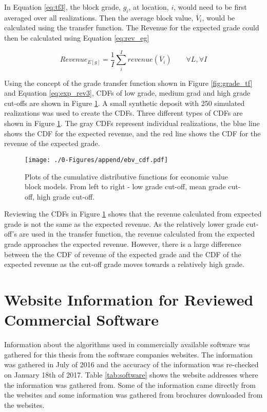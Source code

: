    In Equation \ref{eq:tf3}, the block grade, $g_i$, at location, $i$, would need to be first averaged over all realizations. Then the average block value, $\overline{V}_i$, would be calculated using the transfer function. The Revenue for the expected grade could then be calculated using Equation \ref{eq:rev_eg}

    \begin{equation}
        Revenue_{E\left [ g \right ]} = \frac{1}{I}\sum_{i}^{I}revenue\left ( \overline{V}_i \right ) \qquad \forall L, \forall I
        \label{eq:rev_eg}
    \end{equation}

    Using the concept of the grade transfer function shown in Figure \ref{fig:grade_tf} and Equation \ref{eq:exp_rev3}, \glspl{CDF} of low grade, medium grad and high grade cut-offs are shown in Figure \ref{fig:ebv_cdf}. A small synthetic deposit with 250 simulated realizations was used to create the \glspl{CDF}. Three different types of \glspl{CDF} are shown in Figure \ref{fig:ebv_cdf}. The gray \glspl{CDF} represent individual realizations, the blue line shows the \gls{CDF} for the expected revenue, and the red line shows the \gls{CDF} for the revenue of the expected grade.

    \begin{figure}[htb] %
        \centering
        \texttt{[image: ./0-Figures/append/ebv\_cdf.pdf]}
        \caption[CDF's of expected block value models from different grade transfer functions]{Plots of the cumulative distributive functions for economic value block models. From left to right - low grade cut-off, mean grade cut-off, high grade cut-off.}
        \label{fig:ebv_cdf}
    \end{figure}

    Reviewing the \glspl{CDF} in Figure \ref{fig:ebv_cdf} shows that the revenue calculated from expected grade is not the same as the expected revenue. As the relatively lower grade cut-off's are used in the transfer function, the revenue calculated from the expected grade approaches the expected revenue. However, there is a large difference between the the \gls{CDF} of revenue of the expected grade and the \gls{CDF} of the expected revenue as the cut-off grade moves towards a relatively high grade.

\section{Website Information for Reviewed Commercial Software}
\label{sect:ap-soft}
    Information about the algorithms used in commercially available software was gathered for this thesis from the software companies websites. The information was gathered in July of 2016 and the accuracy of the information was re-checked on January 18th of 2017. Table \ref{tab:software} shows the website addresses where the information was gathered from. Some of the information came directly from the websites and some information was gathered from brochures downloaded from the websites.

